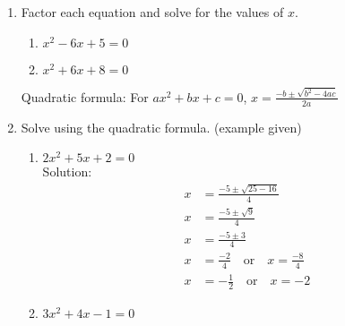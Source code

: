 \documentclass[12pt, twoside]{article}
\begin{document}
\begin{enumerate}
\item Factor each equation and solve for the values of $x$.
  \begin{multicols}{2}
    \begin{enumerate}[itemsep=5cm]
    \item $x^2-6x+5=0$
    \item $x^2+6x+8=0$
  \end{enumerate}
  \end{multicols} \vspace{5cm}

Quadratic formula: For $ax^2+bx+c=0$, $\displaystyle x=\frac{-b \pm \sqrt{b^2-4ac}}{2a}$
\item Solve using the quadratic formula. (example given)
\begin{multicols}{2}
  \begin{enumerate}[itemsep=5cm]
    \item $2x^2 + 5x + 2 = 0$ \\[0.5cm]
    Solution:
      \begin{align*}
        x &= \frac{-5 \pm \sqrt{25 - 16}}{4} \\
        x &= \frac{-5 \pm \sqrt{9}}{4} \\
        x &= \frac{-5 \pm 3}{4} \\
        x &= \frac{-2}{4} \quad \text{or} \quad x = \frac{-8}{4} \\
        x &= -\frac{1}{2} \quad \text{or} \quad x = -2
      \end{align*}
      \item $3x^2 + 4x - 1 = 0$
  \end{enumerate}
  \end{multicols} \vspace{4cm}


\end{enumerate}
\end{document}
